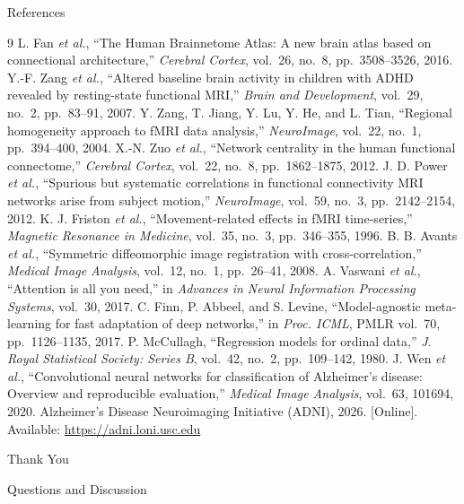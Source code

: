 \documentclass[aspectratio=169,11pt]{beamer}
\begin{document}
\begin{frame}[allowframebreaks]{References}
  \footnotesize
  \begin{thebibliography}{9}
     L. Fan \emph{et al.}, ``The Human Brainnetome Atlas: A new brain
      atlas based on connectional architecture,'' \emph{Cerebral Cortex},
      vol.~26, no.~8, pp.~3508--3526, 2016.
     Y.-F. Zang \emph{et al.}, ``Altered baseline brain activity in
      children with ADHD revealed by resting-state functional MRI,''
      \emph{Brain and Development}, vol.~29, no.~2, pp.~83--91, 2007.
     Y. Zang, T. Jiang, Y. Lu, Y. He, and L. Tian, ``Regional
      homogeneity approach to fMRI data analysis,'' \emph{NeuroImage}, vol.~22,
      no.~1, pp.~394--400, 2004.
     X.-N. Zuo \emph{et al.}, ``Network centrality in the human
      functional connectome,'' \emph{Cerebral Cortex}, vol.~22, no.~8,
      pp.~1862--1875, 2012.
     J. D. Power \emph{et al.}, ``Spurious but systematic
      correlations in functional connectivity MRI networks arise from subject
      motion,'' \emph{NeuroImage}, vol.~59, no.~3, pp.~2142--2154, 2012.
     K. J. Friston \emph{et al.}, ``Movement-related effects in
      fMRI time-series,'' \emph{Magnetic Resonance in Medicine}, vol.~35, no.~3,
      pp.~346--355, 1996.
     B. B. Avants \emph{et al.}, ``Symmetric diffeomorphic image
      registration with cross-correlation,'' \emph{Medical Image Analysis},
      vol.~12, no.~1, pp.~26--41, 2008.
     A. Vaswani \emph{et al.}, ``Attention is all you need,''
      in \emph{Advances in Neural Information Processing Systems}, vol.~30, 2017.
     C. Finn, P. Abbeel, and S. Levine, ``Model-agnostic
      meta-learning for fast adaptation of deep networks,'' in \emph{Proc. ICML},
      PMLR vol.~70, pp.~1126--1135, 2017.
     P. McCullagh, ``Regression models for ordinal data,''
      \emph{J. Royal Statistical Society: Series B}, vol.~42, no.~2,
      pp.~109--142, 1980.
     J. Wen \emph{et al.}, ``Convolutional neural networks for
      classification of Alzheimer's disease: Overview and reproducible
      evaluation,'' \emph{Medical Image Analysis}, vol.~63, 101694, 2020.
     Alzheimer's Disease Neuroimaging Initiative (ADNI), 2026.
      [Online]. Available: \url{https://adni.loni.usc.edu}
  \end{thebibliography}
\end{frame}

\begin{frame}[plain]
  \centering
  \vfill
  {\color{UniversityBlue}\Huge Thank You}\par
  \vspace{0.5cm}
  {\Large Questions and Discussion}\par
  \vspace{0.8cm}
  \vfill
\end{frame}
\end{document}
